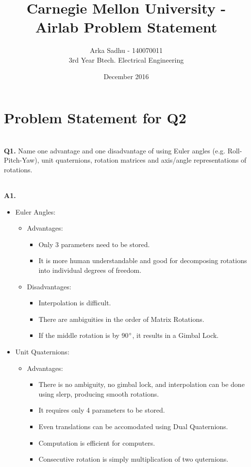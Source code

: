 \documentclass{article}
\title{Carnegie Mellon University - Airlab Problem Statement}
\author
{
  Arka Sadhu - 140070011\\
  3rd Year Btech. Electrical Engineering
}
\date{December 2016}
\newcommand\Problem[1]{
  \\
  \textbf{Q#1.}
}
\newcommand\Sol[1]{
  \\
  \textbf{A#1.}
  \\
}
\begin{document}
\maketitle

\section*{Problem Statement for Q2}
\Problem{1} Name one advantage and one disadvantage of using Euler angles (e.g. Roll-Pitch-Yaw), unit quaternions, rotation matrices and axis/angle representations of rotations.
\Sol{1}
\begin{itemize}
\item Euler Angles:
  \begin{itemize}
  \item Advantages:

    \begin{itemize}
    \item Only 3 parameters need to be stored.
    \item It is more human understandable and good for decomposing rotations into individual degrees of freedom.
    \end{itemize}

  \item Disadvantages:
    \begin{itemize}
    \item Interpolation is difficult.
    \item There are ambiguities in the order of Matrix Rotations.
    \item If the middle rotation is by 90$\degree$, it results in a Gimbal Lock.
    \end{itemize}
  \end{itemize}
  
\item Unit Quaternions:
  \begin{itemize}
  \item Advantages:
    \begin{itemize}
    \item There is no ambiguity, no gimbal lock, and interpolation can be done using slerp, producing smooth rotations.
    \item It requires only 4 parameters to be stored.
    \item Even translations can be accomodated using Dual Quaternions.
    \item Computation is efficient for computers.
    \item Consecutive rotation is simply multiplication of two quternions.
    \end{itemize}


\end{itemize}
\end{itemize}
\end{document}
